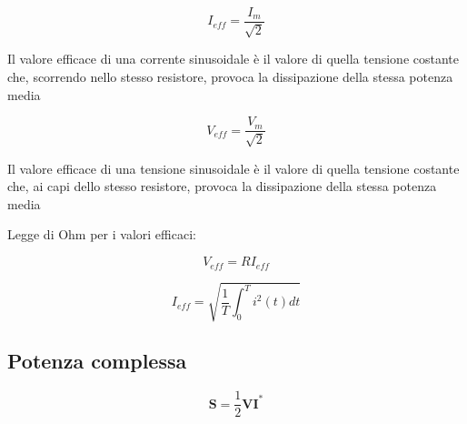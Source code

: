 \documentclass[12pt,titlepage,a4paper]{book}
\begin{document}
$$ I_{eff} = \frac{I_m}{\sqrt{2}} $$

Il valore efficace di una corrente sinusoidale è il valore di quella tensione costante che,
scorrendo nello stesso resistore, provoca la dissipazione della stessa potenza media

$$ V_{eff} = \frac{V_m}{\sqrt{2}} $$

Il valore efficace di una tensione sinusoidale è il valore di quella tensione costante che,
ai capi dello stesso resistore, provoca la dissipazione della stessa potenza media

Legge di Ohm per i valori efficaci:

$$ V_{eff} = R I_{eff} $$

\begin{equation}
  I_{eff} = \sqrt{\frac{1}{T} \int_{0}^{T} i^2(t) dt}
\end{equation}

\subsection{Potenza complessa}

\begin{equation}
  \pmb{S} = \frac{1}{2} \pmb{V} \pmb{I^{*}}
\end{equation}



\end{document}
